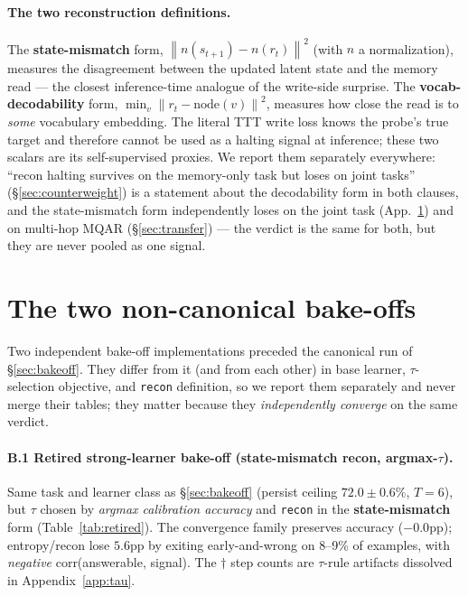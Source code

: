 \documentclass{article}
\newcommand{\norm}[1]{\left\lVert #1 \right\rVert}
\newcommand{\sig}[1]{\texttt{#1}}
\begin{document}
\paragraph{The two reconstruction definitions.} The \textbf{state-mismatch}
form, $\norm{n(s_{t+1}) - n(r_t)}^2$ (with $n$ a normalization), measures the
disagreement between the updated latent state and the memory read --- the
closest inference-time analogue of the write-side surprise. The
\textbf{vocab-decodability} form, $\min_v \norm{r_t - \mathrm{node}(v)}^2$,
measures how close the read is to \emph{some} vocabulary embedding. The literal
TTT write loss knows the probe's true target and therefore cannot be used as a
halting signal at inference; these two scalars are its self-supervised proxies.
We report them separately everywhere: ``recon halting survives on the
memory-only task but loses on joint tasks'' (\S\ref{sec:counterweight}) is a
statement about the decodability form in both clauses, and the state-mismatch
form independently loses on the joint task (App.~\ref{app:weak}) and on
multi-hop MQAR (\S\ref{sec:transfer}) --- the verdict is the same for both, but
they are never pooled as one signal.

\section{The two non-canonical bake-offs}\label{app:weak}

Two independent bake-off implementations preceded the canonical run of
\S\ref{sec:bakeoff}. They differ from it (and from each other) in base learner,
$\tau$-selection objective, and \sig{recon} definition, so we report them
separately and never merge their tables; they matter because they
\emph{independently converge} on the same verdict.

\paragraph{B.1 Retired strong-learner bake-off (state-mismatch recon,
argmax-$\tau$).} Same task and learner class as \S\ref{sec:bakeoff} (persist
ceiling $72.0\pm0.6\%$, $T{=}6$), but $\tau$ chosen by \emph{argmax calibration
accuracy} and \sig{recon} in the \textbf{state-mismatch} form
(Table~\ref{tab:retired}). The convergence family preserves accuracy
($-0.0$pp); entropy/recon lose $5.6$pp by exiting early-and-wrong on 8--9\% of
examples, with \emph{negative} corr(answerable, signal). The $\dagger$ step
counts are $\tau$-rule artifacts dissolved in Appendix~\ref{app:tau}.
\end{document}
